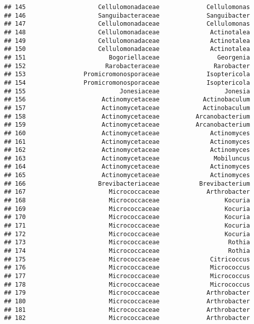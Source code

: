 \documentclass[
]{article}
\begin{document}
\begin{verbatim}
## 145                    Cellulomonadaceae             Cellulomonas
## 146                    Sanguibacteraceae             Sanguibacter
## 147                    Cellulomonadaceae             Cellulomonas
## 148                    Cellulomonadaceae              Actinotalea
## 149                    Cellulomonadaceae              Actinotalea
## 150                    Cellulomonadaceae              Actinotalea
## 151                       Bogoriellaceae                Georgenia
## 152                      Rarobacteraceae               Rarobacter
## 153                Promicromonosporaceae             Isoptericola
## 154                Promicromonosporaceae             Isoptericola
## 155                          Jonesiaceae                  Jonesia
## 156                     Actinomycetaceae            Actinobaculum
## 157                     Actinomycetaceae            Actinobaculum
## 158                     Actinomycetaceae          Arcanobacterium
## 159                     Actinomycetaceae          Arcanobacterium
## 160                     Actinomycetaceae              Actinomyces
## 161                     Actinomycetaceae              Actinomyces
## 162                     Actinomycetaceae              Actinomyces
## 163                     Actinomycetaceae               Mobiluncus
## 164                     Actinomycetaceae              Actinomyces
## 165                     Actinomycetaceae              Actinomyces
## 166                    Brevibacteriaceae           Brevibacterium
## 167                       Micrococcaceae             Arthrobacter
## 168                       Micrococcaceae                  Kocuria
## 169                       Micrococcaceae                  Kocuria
## 170                       Micrococcaceae                  Kocuria
## 171                       Micrococcaceae                  Kocuria
## 172                       Micrococcaceae                  Kocuria
## 173                       Micrococcaceae                   Rothia
## 174                       Micrococcaceae                   Rothia
## 175                       Micrococcaceae              Citricoccus
## 176                       Micrococcaceae              Micrococcus
## 177                       Micrococcaceae              Micrococcus
## 178                       Micrococcaceae              Micrococcus
## 179                       Micrococcaceae             Arthrobacter
## 180                       Micrococcaceae             Arthrobacter
## 181                       Micrococcaceae             Arthrobacter
## 182                       Micrococcaceae             Arthrobacter

\end{verbatim}
\end{document}
